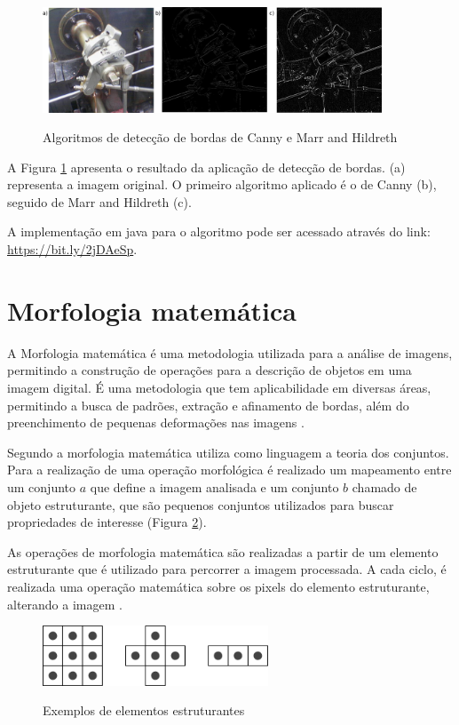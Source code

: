 \documentclass[
	12pt,				%
	oneside,			%
	a4paper,			%
	english,			%
	french,				%
	spanish,			%
	brazil,				%
	]{abntex2}
\begin{document}
\begin{figure}[ht]
\centering
\caption{Algoritmos de detecção de bordas de Canny e Marr and Hildreth}
\includegraphics[width=0.9\textwidth]{imagens/deteccao_bordas2.png}
\sourceAuthor
\label{fig:deteccao_bordas2}
\end{figure}

A Figura \ref{fig:deteccao_bordas2} apresenta o resultado da aplicação de detecção de bordas. (a) representa a imagem original. O primeiro algoritmo aplicado é o de  Canny (b), seguido de Marr and Hildreth (c).

A implementação em java para o algoritmo pode ser acessado através do link: \url{https://bit.ly/2jDAeSp}.

\section{Morfologia matemática}

A Morfologia matemática é uma metodologia utilizada para a análise de imagens, permitindo a construção de operações para a descrição de objetos em uma imagem digital.  É uma metodologia que tem aplicabilidade em diversas áreas, permitindo a busca de padrões, extração e afinamento de bordas, além do preenchimento de pequenas deformações nas imagens \cite{pedriniSchwartz:2008}.

Segundo \citet{gonzalesWoods:2008} a morfologia matemática utiliza como linguagem a teoria dos conjuntos. Para a realização de uma operação morfológica é realizado um mapeamento entre um conjunto \(a\) que define a imagem analisada e um conjunto \(b\) chamado de objeto estruturante, que são pequenos conjuntos utilizados para buscar propriedades de interesse (Figura \ref{fig:elementro_estruturante}). 

As operações de morfologia matemática são realizadas a partir de um elemento estruturante que é utilizado para percorrer a imagem processada. A cada ciclo, é realizada uma operação matemática sobre os pixels do elemento estruturante, alterando a imagem \cite{pedriniSchwartz:2008}.

\begin{figure}[ht]
\centering
\caption{Exemplos de elementos estruturantes}
\includegraphics[width=0.6\textwidth]{imagens/elemento_estruturante.png}
\sourceAuthor
\label{fig:elementro_estruturante}
\end{figure}
\end{document}
